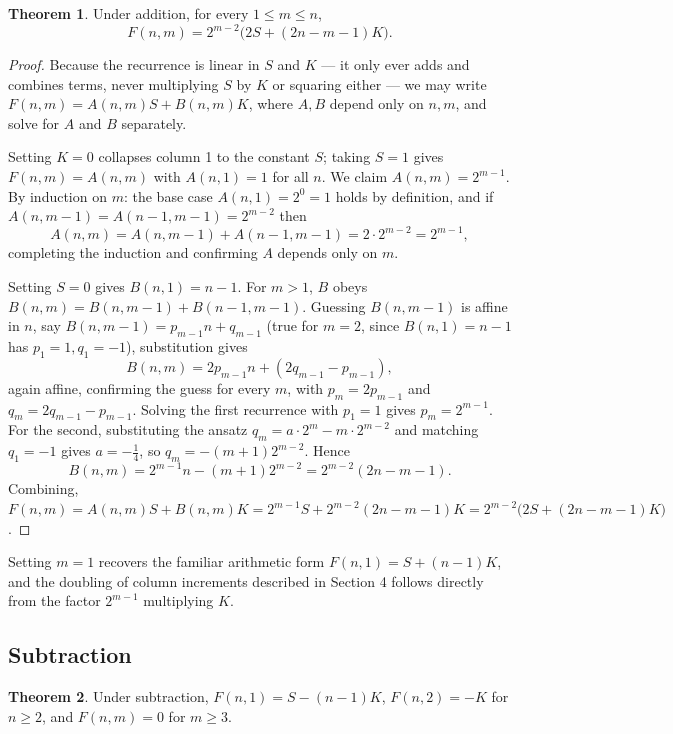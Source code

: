 \documentclass[11pt]{article}
\theoremstyle{definition}
\newtheorem{theorem}{Theorem}[section]
\begin{document}
\begin{theorem}\label{thm:addition}
Under addition, for every $1\le m\le n$,
\[
F(n,m) = 2^{m-2}\bigl(2S + (2n-m-1)K\bigr).
\]
\end{theorem}

\begin{proof}
Because the recurrence is linear in $S$ and $K$ --- it only ever adds and combines terms, never multiplying $S$ by $K$ or squaring either --- we may write $F(n,m) = A(n,m)S + B(n,m)K$, where $A,B$ depend only on $n,m$, and solve for $A$ and $B$ separately.

Setting $K=0$ collapses column 1 to the constant $S$; taking $S=1$ gives $F(n,m)=A(n,m)$ with $A(n,1)=1$ for all $n$. We claim $A(n,m)=2^{m-1}$. By induction on $m$: the base case $A(n,1)=2^0=1$ holds by definition, and if $A(n,m-1)=A(n-1,m-1)=2^{m-2}$ then
\[
A(n,m) = A(n,m-1)+A(n-1,m-1) = 2\cdot 2^{m-2} = 2^{m-1},
\]
completing the induction and confirming $A$ depends only on $m$.

Setting $S=0$ gives $B(n,1)=n-1$. For $m>1$, $B$ obeys $B(n,m)=B(n,m-1)+B(n-1,m-1)$. Guessing $B(n,m-1)$ is affine in $n$, say $B(n,m-1)=p_{m-1}n+q_{m-1}$ (true for $m=2$, since $B(n,1)=n-1$ has $p_1=1,q_1=-1$), substitution gives
\[
B(n,m) = 2p_{m-1}n + (2q_{m-1}-p_{m-1}),
\]
again affine, confirming the guess for every $m$, with $p_m = 2p_{m-1}$ and $q_m = 2q_{m-1}-p_{m-1}$. Solving the first recurrence with $p_1=1$ gives $p_m = 2^{m-1}$. For the second, substituting the ansatz $q_m = a\cdot 2^m - m\cdot 2^{m-2}$ and matching $q_1=-1$ gives $a=-\tfrac14$, so $q_m = -(m+1)2^{m-2}$. Hence
\[
B(n,m) = 2^{m-1}n - (m+1)2^{m-2} = 2^{m-2}(2n-m-1).
\]
Combining, $F(n,m) = A(n,m)S+B(n,m)K = 2^{m-1}S + 2^{m-2}(2n-m-1)K = 2^{m-2}\bigl(2S+(2n-m-1)K\bigr)$.
\end{proof}

Setting $m=1$ recovers the familiar arithmetic form $F(n,1)=S+(n-1)K$, and the doubling of column increments described in Section 4 follows directly from the factor $2^{m-1}$ multiplying $K$.

\subsection{Subtraction}

\begin{theorem}\label{thm:subtraction}
Under subtraction, $F(n,1) = S-(n-1)K$, $F(n,2)=-K$ for $n\ge2$, and $F(n,m)=0$ for $m\ge3$.
\end{theorem}
\end{document}

